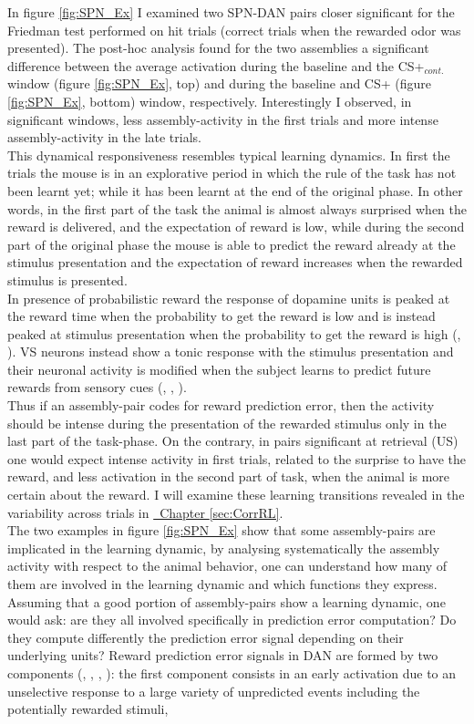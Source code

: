 In figure \ref{fig:SPN_Ex} I examined two SPN-DAN pairs closer significant for the Friedman test performed on hit trials (correct trials when the rewarded odor was presented). The post-hoc analysis found for the two assemblies a significant difference between the average activation during the baseline and the CS+$_{cont.}$ window (figure \ref{fig:SPN_Ex}, top) and during the baseline and CS+ (figure \ref{fig:SPN_Ex}, bottom) window, respectively. Interestingly I observed, in significant windows, less assembly-activity in the first trials and more intense assembly-activity in the late trials.\\This dynamical responsiveness resembles typical learning dynamics. In first the trials the mouse is in an explorative period in which the rule of the task has not been learnt yet; while it has been learnt at the end of the original phase. In other words, in the first part of the task the animal is almost always surprised when the reward is delivered, and the expectation of reward is low, while during the second part of the original phase the mouse is able to predict the reward already at the stimulus presentation and the expectation of reward increases when the rewarded stimulus is presented.\\In presence of probabilistic reward the response of dopamine units is peaked at the reward time when the probability to get the reward is low and is instead peaked at stimulus presentation when the probability to get the reward is high (\cite{Schultz1992}, \cite{Schultz} \cite{Fiorillo}). VS neurons instead show a tonic response with the stimulus presentation and their neuronal activity is modified when the subject learns to predict future rewards from sensory cues (\cite{Pagnoni}, \cite{Schultz2000}, \cite{Radua}).\\Thus if an assembly-pair codes for reward prediction error, then the activity should be intense during the presentation of the rewarded stimulus only in the last part of the task-phase. On the contrary, in pairs significant at retrieval (US) one would expect intense activity in first trials, related to the surprise to have the reward, and less activation in the second part of task, when the animal is more certain about the reward. I will examine these learning transitions revealed in the variability across trials in \hyperref[sec:CorrRL]{~Chapter \ref*{sec:CorrRL}}.\\The two examples in figure \ref{fig:SPN_Ex} show that some assembly-pairs are implicated in the learning dynamic, by analysing systematically the assembly activity with respect to the animal behavior, one can understand how many of them are involved in the learning dynamic and which functions they express. Assuming that a good portion of assembly-pairs show a learning dynamic, one would ask: are they all involved specifically in prediction error computation? Do they compute differently the prediction error signal depending on their underlying units? Reward prediction error signals in DAN are formed by two components (\cite{Tobler2003}, \cite{Nomoto2010}, \cite{Fiorillo2013}, \cite{Schultz2016}): the first component consists in an early activation due to an unselective response to a large variety of unpredicted events including the potentially rewarded stimuli, 